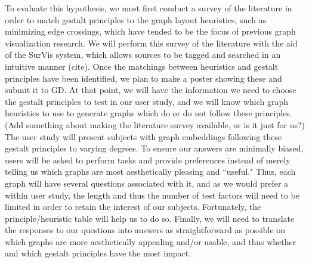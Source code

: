 \documentclass[12pt, twocolumn]{article}
\begin{document}
To evaluate this hypothesis, we must first conduct a survey of the literature in order to match gestalt principles to the graph layout heuristics, such as minimizing edge crossings, which have tended to be the focus of previous graph visualization research. 
We will perform this survey of the literature with the aid of the SurVis system, which allows sources to be tagged and searched in an intuitive manner (cite).
Once the matchings between heuristics and gestalt principles have been identified, we plan to make a poster showing these and submit it to GD. 
At that point, we will have the information we need to choose the gestalt principles to test in our user study, and we will know which graph heuristics to use to generate graphs which do or do not follow these principles.
\\
(Add something about making the literature survey available, or is it just for us?)
\\


The user study will present subjects with graph embeddings following these  gestalt principles to varying degrees.
To ensure our answers are minimally biased, users will be asked to perform tasks and provide preferences instead of merely telling us which graphs are most aesthetically pleasing and ``useful."
Thus, each graph will have several questions associated with it, and as we would prefer a within user 
study, the length and thus the number of test factors will need to be limited in order to retain the interest of our subjects. 
Fortunately, the principle/heuristic table will help us to do so.
Finally, we will need to translate the responses to our questions into answers as straightforward as possible on which graphs are more aesthetically appealing and/or usable, and thus whether and which gestalt principles have the most impact. 
\end{document}
